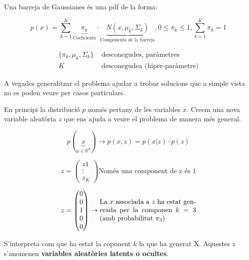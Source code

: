 Una barreja de Gaussianes és una pdf de la forma:

$$ 
p(x) = \sum_{k=1}^K \underbrace{\pi_k}_{\text{Coeficients}}·
\underbrace{N(x, \mu_k, \Sigma_k)}_{\text{Components de la barreja}}, 
0 \le \pi_k \le 1, \sum_{k=1}^K \pi_k = 1
$$

\begin{align*}
	\{\pi_k, \mu_k, \Sigma_k\} & \text{  desconegudes, paràmetres} \\
	K & \text{  desconegudea (hiper-paràmetre)}
\end{align*}

A vegades generalitzar el problema ajudar a trobar solucions que a simple vista no es poden veure per casos particulars. 

En principi la distribució $p$ només pertany de les variables $x$. Creem una nova variable aleatòria $z$ que ens ajuda a veure el problema de manera més general.

$$
p(\underbrace{x}_{x \in \mathbb{R}^d}) \to p(x,z) = p(x|z)·p(z)
$$

$$ 
z = 
\begin{pmatrix}
z1 \\ \vdots \\ z_K
\end{pmatrix} \text{Només una component de z és 1} 
$$

$$
z = 
\begin{pmatrix}
0 \\
0 \\
1 \\
0 \\
0
\end{pmatrix}
\to
\parbox{14em}{La $x$ associada a $z$ ha estat generada per la componen $k=3$ (amb probabilitat $\pi_3$)}
$$

S'interpreta com que ha estat la coponent $k$ la que ha generat X. Aquestes $z$ s'anomenen \textbf{variables aleatòries latents o ocultes}.

